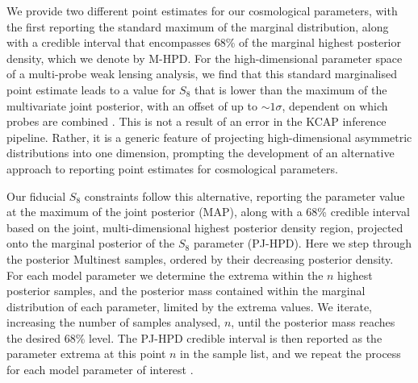 We provide two different point estimates for our cosmological parameters, with the first reporting the standard maximum of the marginal distribution, 
along with a credible interval that encompasses 68\% of the marginal highest posterior density, which we denote by M-HPD.  
For the high-dimensional parameter space of a multi-probe weak lensing analysis, we find that this standard marginalised point estimate leads to a value for $S_8$ that is lower than the 
maximum of the multivariate joint posterior, with an offset of up to $\sim 1 \sigma$, dependent on which probes are combined \citep[see section 7 of][]{joachimi/etal:inprep}.
This is not a result of an error in the {\sc KCAP} inference pipeline. 
Rather, it is a generic feature of projecting high-dimensional asymmetric distributions into one dimension, prompting the development of an alternative approach to reporting point estimates for cosmological parameters.

Our fiducial $S_8$ constraints follow this alternative, reporting the parameter value at the maximum of the joint posterior (MAP), along with a 68\% credible interval based on the joint, multi-dimensional highest posterior density region, projected onto the marginal posterior of the $S_8$ parameter (PJ-HPD).   
Here we step through the posterior {\sc Multinest} samples, ordered by their decreasing posterior density.  
For each model parameter we determine the extrema within the $n$ highest posterior samples, and the posterior mass contained within the marginal distribution of each parameter, limited by the extrema values.   
We iterate, increasing the number of samples analysed, $n$, until the posterior mass reaches the desired 68\% level.   
The PJ-HPD credible interval is then reported as the parameter extrema at this point $n$ in the sample list, and we repeat the process for each model parameter of interest \citep[see section 6.4 of][for further details]{joachimi/etal:inprep}.   

